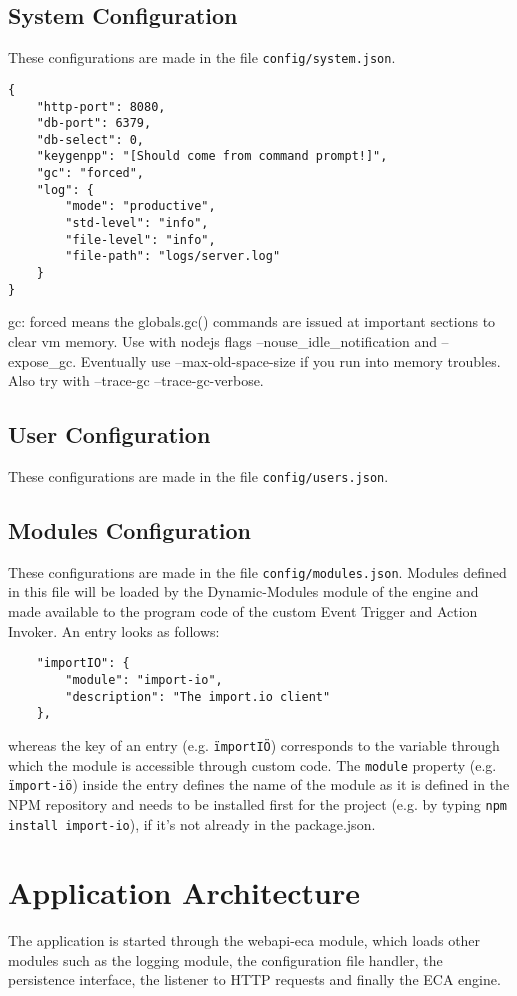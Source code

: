 \documentclass{article}
\begin{document}
	\subsection{System Configuration}
		These configurations are made in the file \texttt{config/system.json}.
\begin{lstlisting}
{
	"http-port": 8080,
	"db-port": 6379,
	"db-select": 0,
	"keygenpp": "[Should come from command prompt!]",
	"gc": "forced",
	"log": {
		"mode": "productive",
		"std-level": "info",
		"file-level": "info",
		"file-path": "logs/server.log"
	}
}
\end{lstlisting}
	gc: forced means the globals.gc() commands are issued at important sections to clear vm memory. Use with nodejs flags --nouse_idle_notification and --expose_gc.
	Eventually use --max-old-space-size if you run into memory troubles. Also try with --trace-gc --trace-gc-verbose.

	\subsection{User Configuration}
		These configurations are made in the file \texttt{config/users.json}.

	\subsection{Modules Configuration}
		These configurations are made in the file \texttt{config/modules.json}.
		Modules defined in this file will be loaded by the Dynamic-Modules module of the engine
		and made available to the program code of the custom Event Trigger and Action Invoker.
		An entry looks as follows:
\begin{lstlisting}
	"importIO": {
		"module": "import-io",
		"description": "The import.io client"
	},
\end{lstlisting}
		whereas the key of an entry (e.g. \texttt{\"importIO\"}) corresponds to the variable through which the module is accessible
		through custom code. The \texttt{module} property (e.g. \texttt{\"import-io\"}) inside the entry
		defines the name of the module as it is defined in the NPM repository and needs to be installed
		first for the project (e.g. by typing \texttt{npm install import-io}), if it's not already in the package.json.



\section{Application Architecture}
The application is started through the webapi-eca module, which loads other modules such as the logging module, the configuration file handler, the persistence interface, the listener to HTTP requests and finally the ECA engine.
\end{document}
